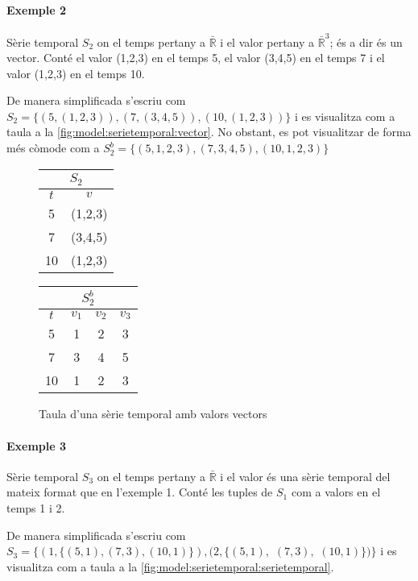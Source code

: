 \paragraph{Exemple 2}
Sèrie temporal $S_2$ on el temps pertany a $\bar{\mathbb{R}}$ i el valor pertany a  $\bar{\mathbb{R}}^3$; és a dir és un vector. Conté el valor (1,2,3) en el temps 5, el valor (3,4,5) en el temps 7 i el valor (1,2,3) en el temps 10.

De manera simplificada s'escriu com 
$S_2 = \{ (5,(1,2,3)), (7,(3,4,5)), (10,(1,2,3)) \}$ i es visualitza com a taula a la \autoref{fig:model:serietemporal:vector}. No obstant, es pot visualitzar de forma més còmode com a $S_2^b = \{ (5,1,2,3), (7,3,4,5), (10,1,2,3) \}$

\begin{figure}[tp]
  \centering
  \begin{tabular}{|c|c|}
    \multicolumn{2}{c}{$S_2$} \\ \hline
    $t$  & $v$ \\ \hline
    5  & (1,2,3) \\
    7  & (3,4,5) \\
    10 & (1,2,3) \\ \hline
  \end{tabular} \qquad
  \begin{tabular}[tp]{|c|c|c|c|}
   \multicolumn{4}{c}{$S_2^b$} \\ \hline
    $t$  & $v_1$ & $v_2$ & $v_3$ \\ \hline
    5  & 1 & 2 & 3 \\
    7  & 3 & 4 & 5 \\
    10 & 1 & 2 & 3 \\ \hline
  \end{tabular}

  \caption{Taula d'una sèrie temporal amb valors vectors}
  \label{fig:model:serietemporal:vector}
\end{figure}


\paragraph{Exemple 3}
Sèrie temporal $S_3$ on el temps pertany a $\bar{\mathbb{R}}$ i el valor és una sèrie temporal del mateix format que en l'exemple 1. Conté les tuples de $S_1$ com a valors en el temps 1 i 2. 

De manera simplificada s'escriu com
$S_3 =  \{ (1,\{ (5,1), (7,3), (10,1) \}), 
(2,\{ (5,1),$ $(7,3),$ $(10,1) \}) \}$
i es visualitza com a taula a la \autoref{fig:model:serietemporal:serietemporal}.


